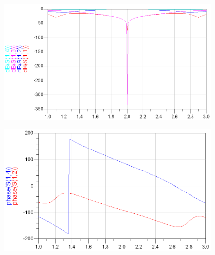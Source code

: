 \documentclass[11pt,a4paper]{report}
\begin{document}
\begin{figure}
\centuring
\includegraphics[width=0.5\textwodth]{2.5.png}
\caption{}
\end{figure}

\begin{figure}
\centuring
\includegraphics[width=0.5\textwodth]{2.6.png}
\caption{}
\end{figure}
\end{document}
